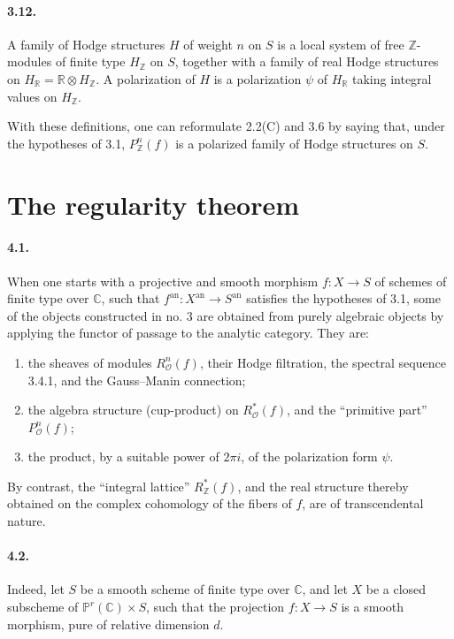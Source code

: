 \documentclass[10pt]{article}
\newcommand{\C}{\mathbb C}
\newcommand{\R}{\mathbb R}
\newcommand{\Z}{\mathbb Z}
\newcommand{\Pj}{\mathbb P}
\newcommand{\cO}{\mathcal O}
\theoremstyle{deligne}
\begin{document}
\paragraph{3.12.}
A family of Hodge structures $H$ of weight $n$ on $S$ is a local system of free $\Z$-modules of finite type $H_\Z$ on $S$, together with a family of real Hodge structures on $H_\R=\R\otimes H_\Z$. A polarization of $H$ is a polarization $\psi$ of $H_\R$ taking integral values on $H_\Z$.

With these definitions, one can reformulate 2.2(C) and 3.6 by saying that, under the hypotheses of 3.1, $P_\Z^n(f)$ is a polarized family of Hodge structures on $S$.

\section{The regularity theorem}

\paragraph{4.1.}
When one starts with a projective and smooth morphism $f:X\to S$ of schemes of finite type over $\C$, such that $f^{\mathrm{an}}:X^{\mathrm{an}}\to S^{\mathrm{an}}$ satisfies the hypotheses of 3.1, some of the objects constructed in no. 3 are obtained from purely algebraic objects by applying the functor of passage to the analytic category. They are:
\begin{enumerate}[label=\alph*)]
\item the sheaves of modules $R_\cO^n(f)$, their Hodge filtration, the spectral sequence 3.4.1, and the Gauss--Manin connection;
\item the algebra structure (cup-product) on $R_\cO^*(f)$, and the ``primitive part'' $P_\cO^n(f)$;
\item the product, by a suitable power of $2\pi i$, of the polarization form $\psi$.
\end{enumerate}
By contrast, the ``integral lattice'' $R_\Z^*(f)$, and the real structure thereby obtained on the complex cohomology of the fibers of $f$, are of transcendental nature.

\paragraph{4.2.}
Indeed, let $S$ be a smooth scheme of finite type over $\C$, and let $X$ be a closed subscheme of $\Pj^r(\C)\times S$, such that the projection $f:X\to S$ is a smooth morphism, pure of relative dimension $d$.
\end{document}
